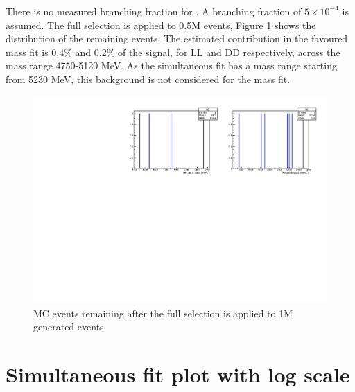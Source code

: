 \subsubsection{\decay{\Bs}{\Dz\KS\pi\pi}}

There is no measured branching fraction for \decay{\Bs}{\Dz\KS\pi\pi}. A \decay{\Bs}{\Dz\KS\pi\pi} branching fraction of $5 \times 10^{-4}$ is assumed. The full selection is applied to 0.5M \decay{\Bs}{\Dz\KS\pi\pi} events, Figure \ref{Bs2D0KsPiPi} shows the distribution of the remaining events. The estimated contribution in the favoured \decay{\B}{\D(\kaon\pi)\Kstar} mass fit is 0.4\% and 0.2\% of the signal, for LL and DD respectively, across the mass range 4750-5120 MeV. As the simultaneous fit has a mass range starting from 5230 MeV, this background is not considered for the mass fit.

\begin{figure}[h]
\centering
\includegraphics[width=0.7\linewidth]{figures/backgrounds/Bs2D0KsPiPi.pdf}
\caption{\decay{\Bs}{\Dz\KS\pi\pi} MC events remaining after the full selection is applied to 1M generated events}
\label{Bs2D0KsPiPi}
\end{figure}

\clearpage

\section{Simultaneous fit plot with log scale}
\label{app:sec:logscale}


